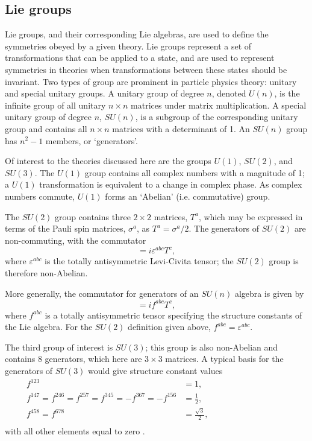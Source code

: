 
\subsection{Lie groups}

Lie groups, and their corresponding Lie algebras, are used to define the
symmetries obeyed by a given theory. Lie groups represent a set of
transformations that can be applied to a state, and are used to represent
symmetries in theories when transformations between these states should be
invariant.  Two types of group are prominent in particle physics theory: unitary
and special unitary groups.  A unitary group of degree $n$, denoted $U(n)$, is
the infinite group of all unitary $n\times n$ matrices under matrix
multiplication.  A special unitary group of degree $n$, $SU(n)$, is a subgroup
of the corresponding unitary group and contains all $n\times n$ matrices with a
determinant of 1. An $SU(n)$ group has $n^2-1$ members, or `generators'.

Of interest to the theories discussed here are the groups $U(1)$, $SU(2)$, and
$SU(3)$. The $U(1)$ group contains all complex numbers with a magnitude of 1; a
$U(1)$ transformation is equivalent to a change in complex phase. As complex
numbers commute, $U(1)$ forms an `Abelian' (i.e. commutative) group.

The $SU(2)$ group contains three $2\times 2$ matrices, $T^a$, which may be
expressed in terms of the Pauli spin matrices, $\sigma^a$, as $T^a = \sigma^a/2$. The
generators of $SU(2)$ are non-commuting, with the commutator
\begin{equation*}
  [T^a,T^b] = i \varepsilon^{abc} T^c,
\end{equation*}
where $\varepsilon^{abc}$ is the totally antisymmetric Levi-Civita tensor;
the $SU(2)$ group is therefore non-Abelian.

More generally, the commutator for generators of an $SU(n)$ algebra is given by
\begin{equation}
  [T^a,T^b] = if^{abc}T^{c},
  \label{eqn:theory-symmetry-gen-commutator}
\end{equation}
where $f^{abc}$ is a totally antisymmetric tensor specifying the structure
constants of the Lie algebra. For the $SU(2)$ definition given above,
$f^{abc}=\varepsilon^{abc}$.

The third group of interest is $SU(3)$; this group is also non-Abelian and
contains 8 generators, which here are $3\times 3$ matrices. A
typical basis for the generators of $SU(3)$ would give structure constant values
\begin{equation*}
  \begin{split}
    f^{123} &= 1, \\
    f^{147} = f^{246} = f^{257} = f^{345} = -f^{367} = -f^{156} &= \frac12,
    \hspace{10em}\\
    f^{458} = f^{678} &= \frac{\sqrt{3}}2, \\
  \end{split}
\end{equation*}
%
with all other elements equal to zero \cite{gellmann1961}.


